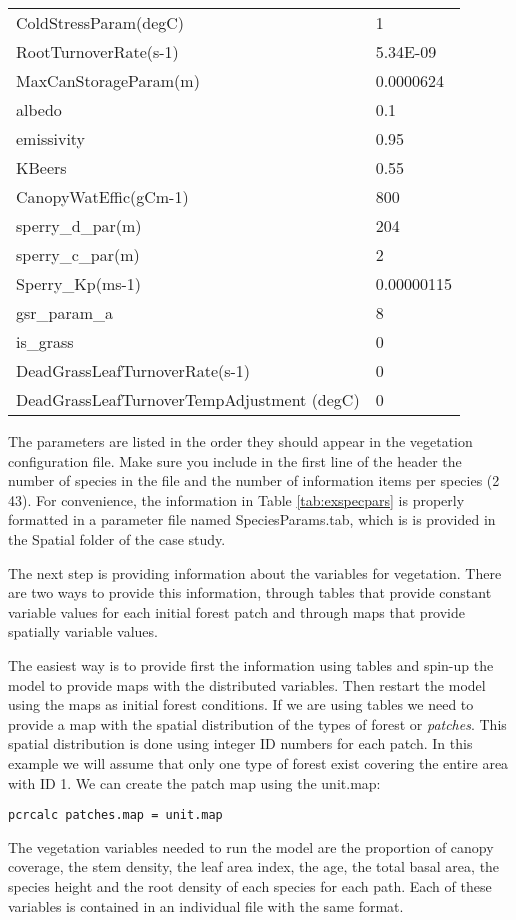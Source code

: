 \begin{longtable}{|p{6.5cm}| l|}
ColdStressParam(degC)	&	1	\\
RootTurnoverRate(s-1)	&	5.34E-09	\\
MaxCanStorageParam(m)	&	0.0000624	\\
albedo	&	0.1	\\
emissivity	&	0.95	\\
KBeers	&	0.55	\\
CanopyWatEffic(gCm-1)	&	800	\\
sperry\_d\_par(m)	&	204	\\
sperry\_c\_par(m)	&	2	\\
Sperry\_Kp(ms-1)	&	0.00000115	\\
gsr\_param\_a	&	8	\\
is\_grass	&	0	\\
DeadGrassLeafTurnoverRate(s-1)	&	0	\\
DeadGrassLeafTurnoverTempAdjustment (degC)	&	0	
\end{longtable}			

 
The parameters are listed in the order they should appear in the vegetation configuration file. Make sure you include in the first line of the header the number of species in the file and the number of information items per species (2 43). For convenience, the information in Table \ref{tab:exspecpars} is properly formatted in a parameter file named \textsf{SpeciesParams.tab}, which is is provided in the \textsf{Spatial} folder of the case study.

The next step is providing information about the variables for vegetation. There are two ways to provide this information, through tables that provide constant variable values for each initial forest patch and through maps that provide spatially variable values.
 
The easiest way is to provide first the information using tables and spin-up the model to provide maps with the distributed variables. Then restart the model using the maps as initial forest conditions. If we are using tables we need to provide a map with the spatial distribution of the types of forest or \textit{patches}. This spatial distribution is done using integer ID numbers for each patch. In this example we will assume that only one type of forest exist covering the entire area with ID 1. We can create the patch map using the unit.map:

\begin{verbatim}
pcrcalc patches.map = unit.map 
\end{verbatim}
   
The vegetation variables needed to run the model are the proportion of canopy coverage, the stem density, the leaf area index, the age, the total basal area, the species height and the root density of each species for each path. Each of these variables is contained in an individual file with the same format. 

